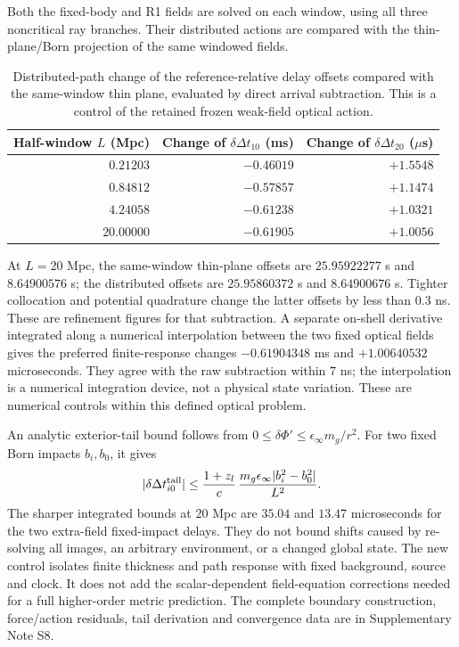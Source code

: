 Both the fixed-body and R1 fields are solved on each window, using all
three noncritical ray branches. Their distributed actions are compared
with the thin-plane/Born projection of the same windowed fields.
\begin{table}[htbp]
 \centering
 \caption{Distributed-path change of the reference-relative delay
 offsets compared with the same-window thin plane, evaluated by direct
 arrival subtraction. This is a control of the retained frozen
 weak-field optical action.}
 \label{tab:distributed-control}
 \begin{tabular}{rrr}
 \toprule
 Half-window $L$ (Mpc) & Change of $\delta\Delta t_{10}$ (ms)
 & Change of $\delta\Delta t_{20}$ ($\mu$s)\\
 \midrule
 $0.21203$ & $-0.46019$ & $+1.5548$\\
 $0.84812$ & $-0.57857$ & $+1.1474$\\
 $4.24058$ & $-0.61238$ & $+1.0321$\\
 $20.00000$ & $-0.61905$ & $+1.0056$\\
 \bottomrule
 \end{tabular}
\end{table}
At $L=20$ Mpc, the same-window thin-plane offsets are
$25.95922277$ s and $8.64900576$ s; the distributed offsets are
$25.95860372$ s and $8.64900676$ s. Tighter collocation and potential
quadrature change the latter offsets by less than $0.3$ ns. These are
refinement figures for that subtraction. A separate on-shell derivative
integrated along a numerical interpolation between the two fixed optical
fields gives the preferred finite-response changes $-0.61904348$ ms
and $+1.00640532$ microseconds. They agree with the raw subtraction
within $7$ ns; the interpolation is a numerical integration device,
not a physical state variation. These are numerical controls within
this defined optical problem.

An analytic exterior-tail bound follows from
$0\le\delta\Phi'\le\epsilon_\infty m_g/r^2$. For two fixed Born
impacts $b_i,b_0$, it gives
\begin{equation}
 |\delta\Delta t_{i0}^{\rm tail}|
 \le\frac{1+z_l}{c}\,
       \frac{m_g\epsilon_\infty|b_i^2-b_0^2|}{L^2}.
 \label{eq:tail-bound}
\end{equation}
The sharper integrated bounds at $20$ Mpc are $35.04$ and $13.47$
microseconds for the two extra-field fixed-impact delays. They do not
bound shifts caused by re-solving all images, an arbitrary environment,
or a changed global state. The new control isolates finite thickness
and path response with fixed background, source and clock. It does not
add the scalar-dependent field-equation corrections needed for a full
higher-order metric prediction. The complete boundary construction,
force/action residuals, tail derivation and convergence data are in
Supplementary Note S8.


